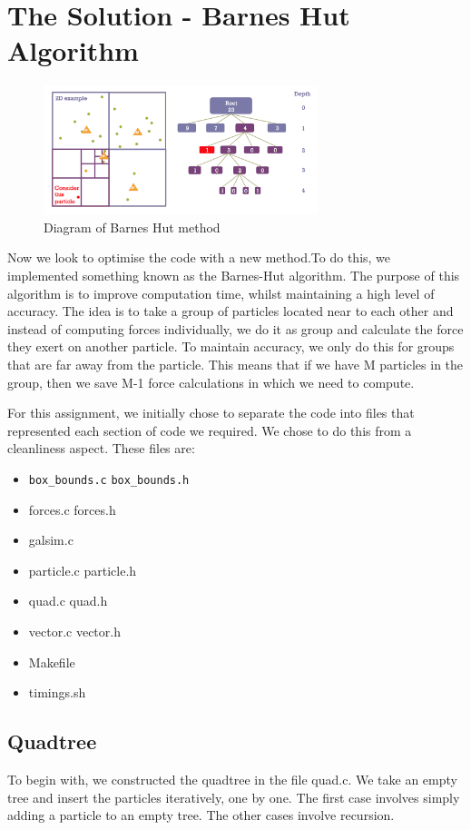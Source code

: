 \section{The Solution - Barnes Hut Algorithm}
\begin{figure}[htb]
  \begin{center}
    \includegraphics[width=8cm]{../images/tree_walk.png}
    \caption{Diagram of Barnes Hut method}
  \end{center}
\end{figure}
Now we look to optimise the code with a new method.To do this, we implemented something known as the Barnes-Hut algorithm. The purpose of this algorithm is to improve computation time, whilst maintaining a high level of accuracy. The idea is to take a group of particles located near to each other and instead of computing forces individually, we do it as group and calculate the force they exert on another particle. To maintain accuracy, we only do this for groups that are far away from the particle. This means that if we have M particles in the group, then we save M-1 force calculations in which we need to compute.

For this assignment, we initially  chose to separate the code into files that represented each section of code we required. We chose to do this from a cleanliness aspect. These files are:
\begin{itemize}
    \item \verb|box_bounds.c| \verb|box_bounds.h|
    \item forces.c forces.h
    \item galsim.c
    \item particle.c particle.h
    \item quad.c quad.h
    \item vector.c vector.h
    \item Makefile
    \item timings.sh
\end{itemize}
\subsection{Quadtree}
To begin with, we constructed the quadtree in the file quad.c. We take an empty tree and insert the particles iteratively, one by one. The first case involves simply adding a particle to an empty tree. The other cases involve recursion.

